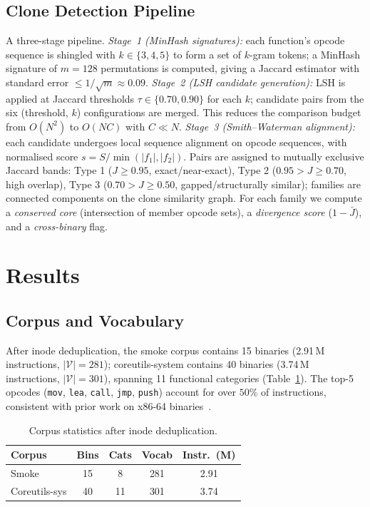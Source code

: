 \documentclass[conference]{IEEEtran}
\begin{document}
\subsection{Clone Detection Pipeline}
A three-stage pipeline.
\emph{Stage~1 (MinHash signatures):} each function's opcode sequence is
shingled with $k{\in}\{3,4,5\}$ to form a set of $k$-gram tokens; a
MinHash signature of $m{=}128$ permutations is computed, giving a
Jaccard estimator with standard error
${\leq}1/\sqrt{m}{\approx}0.09$.
\emph{Stage~2 (LSH candidate generation):} LSH is applied at Jaccard
thresholds $\tau{\in}\{0.70,0.90\}$ for each $k$; candidate pairs from
the six (threshold, $k$) configurations are merged.  This reduces the
comparison budget from $O(N^2)$ to $O(NC)$ with $C{\ll}N$.
\emph{Stage~3 (Smith--Waterman alignment):} each candidate undergoes
local sequence alignment on opcode sequences, with normalised score
$s{=}S/\min(|f_1|,|f_2|)$.  Pairs are assigned to mutually exclusive
Jaccard bands: Type 1 ($J{\geq}0.95$, exact/near-exact),
Type 2 ($0.95{>}J{\geq}0.70$, high overlap),
Type 3 ($0.70{>}J{\geq}0.50$, gapped/structurally similar); families are
connected components on the clone similarity graph.  For each family we
compute a \emph{conserved core} (intersection of member opcode sets), a
\emph{divergence score} ($1{-}\bar{J}$), and a \emph{cross-binary} flag.

\section{Results}
\label{sec:results}

\subsection{Corpus and Vocabulary}

After inode deduplication, the smoke corpus contains 15 binaries
(2.91\,M instructions, $|\mathcal{V}|{=}281$); coreutils-system contains
40 binaries (3.74\,M instructions, $|\mathcal{V}|{=}301$),
spanning 11 functional categories (Table~\ref{tab:corpus}).
The top-5 opcodes (\texttt{mov}, \texttt{lea}, \texttt{call}, \texttt{jmp},
\texttt{push}) account for over $50\%$ of instructions, consistent with
prior work on x86-64 binaries~\cite{bilar2007opcodes}.

\begin{table}[t]
\centering
\caption{Corpus statistics after inode deduplication.}
\label{tab:corpus}
\begin{tabular}{@{}lcccc@{}}
\toprule
\textbf{Corpus} & \textbf{Bins} & \textbf{Cats} & \textbf{Vocab} & \textbf{Instr.\ (M)} \\
\midrule
Smoke            & 15  & 8   & 281 & 2.91 \\
Coreutils-sys    & 40  & 11  & 301 & 3.74 \\
\bottomrule
\end{tabular}
\end{table}
\end{document}

